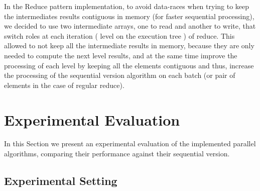 \documentclass[conference,compsoc]{IEEEtran}
\begin{document}


In the Reduce pattern implementation, to avoid data-races when trying to keep the intermediates results contiguous in memory (for faster sequential processing), we decided to use two intermediate arrays, one to read and another to write, that switch roles at each iteration ( level on the execution tree ) of reduce. This allowed to not keep all the intermediate results in memory, because they are only needed to compute the next level results, and at the same time improve the processing of each level by keeping all the elements contiguous and thus, increase the processing of the sequential version algorithm on each batch (or pair of elements in the case of regular reduce).



\section{Experimental Evaluation} \label{Experimental_Eval}
In this Section we present an experimental evaluation of the implemented parallel algorithms, comparing their performance against their sequential version.

\subsection{Experimental Setting}

\end{document}

